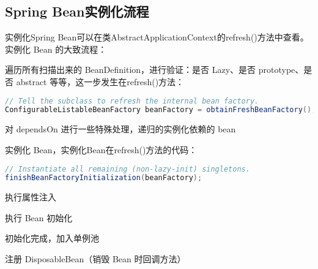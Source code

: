 \documentclass[../../../interview-questions.tex]{subfiles}
\begin{document}
\subsection{Spring Bean实例化流程}

实例化Spring Bean可以在类AbstractApplicationContext的refresh()方法中查看。实例化 Bean 的大致流程：

遍历所有扫描出来的 BeanDefinition，进行验证：是否 Lazy、是否 prototype、是否 abstract 等等，这一步发生在refresh()方法：

\begin{lstlisting}[language=Java]
// Tell the subclass to refresh the internal bean factory.
ConfigurableListableBeanFactory beanFactory = obtainFreshBeanFactory();  
\end{lstlisting}

对 dependsOn 进行一些特殊处理，递归的实例化依赖的 bean

实例化 Bean，实例化Bean在refresh()方法的代码：

\begin{lstlisting}[language=Java]
// Instantiate all remaining (non-lazy-init) singletons.
finishBeanFactoryInitialization(beanFactory);    
\end{lstlisting}


执行属性注入

执行 Bean 初始化

初始化完成，加入单例池

注册 DisposableBean（销毁 Bean 时回调方法）
\end{document}
